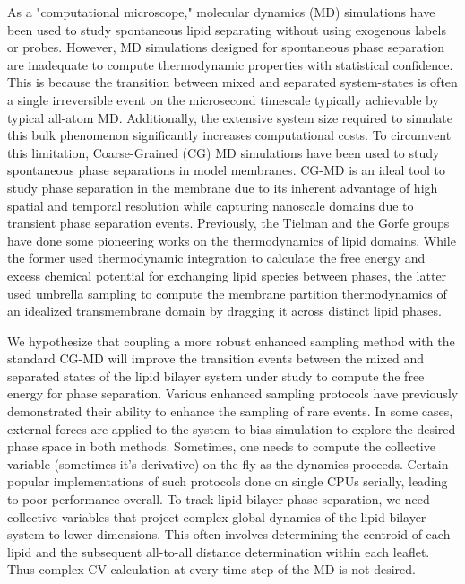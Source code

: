 \documentclass{biophys-new}
\begin{document}
As a "computational microscope\cite{Dror2012}," molecular dynamics (MD) simulations have been used to study spontaneous lipid separating without using exogenous labels or probes\cite{Pantelopulos2018}.
However, MD simulations designed for spontaneous phase separation are inadequate to compute thermodynamic properties with statistical confidence.
This is because the transition between mixed and separated system-states is often a single irreversible event on the microsecond timescale typically achievable by typical all-atom MD.
Additionally, the extensive system size required to simulate this bulk phenomenon significantly increases computational costs.
To circumvent this limitation, Coarse-Grained (CG) MD simulations have been used to study spontaneous phase separations in model membranes\cite{Risselada2008}\cite{Bennett2018}.
CG-MD is an ideal tool to study phase separation in the membrane due to its inherent advantage of high spatial and temporal resolution while capturing nanoscale domains due to transient phase separation events.
Previously, the Tielman\cite{Bennett2018} and the Gorfe groups\cite{Lin2019} have done some pioneering works on the thermodynamics of lipid domains.
While the former used thermodynamic integration\cite{Salsburg1953} to calculate the free energy and excess chemical potential for exchanging lipid species between phases, the latter used umbrella sampling\cite{TorrieG.MValleau1977} to compute the membrane partition thermodynamics of an idealized transmembrane domain by dragging it across distinct lipid phases.

We hypothesize that coupling a more robust enhanced sampling method with the standard CG-MD will improve the transition events between the mixed and separated states of the lipid bilayer system under study to compute the free energy for phase separation.
Various enhanced sampling protocols have previously demonstrated their ability to enhance the sampling of rare events\cite{Henin2022}.
In some cases, external forces are applied to the system to bias simulation to explore the desired phase space in both methods.
Sometimes, one needs to compute the collective variable (sometimes it's derivative) on the fly as the dynamics proceeds.
Certain popular implementations of such protocols done on single CPUs serially, leading to poor performance overall.
To track lipid bilayer phase separation, we need collective variables that project complex global dynamics of the lipid bilayer system to lower dimensions.
This often involves determining the centroid of each lipid and the subsequent all-to-all distance determination within each leaflet.
Thus complex CV calculation at every time step of the MD is not desired.
\end{document}
